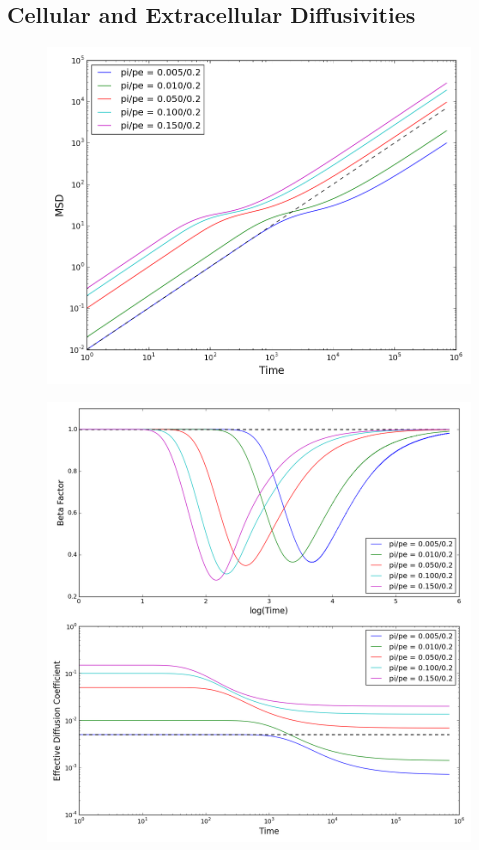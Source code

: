 \newpage
\subsection{Cellular and Extracellular Diffusivities}
\label{sec:1D-cellular-extracellular-diffusivities}
	
	\begin{figure}[h]
		\centering
		\includegraphics[width=1.0\linewidth]{../images/1D/pipe_msd_1D}
		\caption{}
		\label{fig:pipe_msd_1D}
	\end{figure}
	
	\begin{figure}[h]
		\centering
		\includegraphics[width=1.0\linewidth]{../images/1D/pipe_beta_deff_1D}
		\caption{}
		\label{fig:pipe_beta_deff_1D}
	\end{figure}

